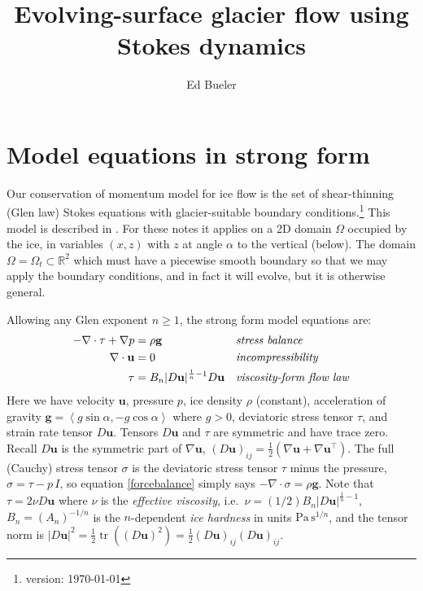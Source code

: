 \documentclass[letterpaper,final,12pt,reqno]{amsart}
\newcommand{\RR}{\mathbb{R}}
\newcommand{\grad}{\nabla}
\newcommand{\Div}{\nabla\cdot}
\newcommand{\trace}{\operatorname{tr}}
\newcommand{\bg}{\mathbf{g}}
\newcommand{\bu}{\mathbf{u}}
\begin{document}
\title{Evolving-surface glacier flow using Stokes dynamics}

\author{Ed Bueler}

\maketitle

\thispagestyle{empty}
\bigskip

\section{Model equations in strong form} \label{sec:strongform}

Our conservation of momentum model for ice flow is the set of shear-thinning (Glen law) Stokes equations with glacier-suitable boundary conditions.\footnote{version: \today}  This model is described in \cite{GreveBlatter2009,JouvetRappaz2011}.  For these notes it applies on a 2D domain $\Omega$ occupied by the ice, in variables $(x,z)$ with $z$ at angle $\alpha$ to the vertical (below).  The domain $\Omega = \Omega_t \subset \RR^2$ which must have a piecewise smooth boundary so that we may apply the boundary conditions, and in fact it will evolve, but it is otherwise general.

Allowing any Glen exponent $n\ge 1$, the strong form model equations are:
\begin{align}
- \nabla \cdot \tau + \nabla p &= \rho \bg &&\text{\emph{stress balance}} \label{forcebalance} \\
\nabla \cdot \bu &= 0 &&\text{\emph{incompressibility}} \label{incompressible} \\
\tau &= B_n |D\bu|^{\frac{1}{n} - 1} D\bu  &&\text{\emph{viscosity-form flow law}} \label{viscflowlaw}
\end{align}
Here we have velocity $\bu$, pressure $p$, ice density $\rho$ (constant), acceleration of gravity $\bg = \left<g\sin\alpha,-g\cos\alpha\right>$ where $g>0$, deviatoric stress tensor $\tau$, and strain rate tensor $D\bu$.  Tensors $D\bu$ and $\tau$ are symmetric and have trace zero.  Recall $D\bu$ is the symmetric part of $\grad \bu$, $(D\bu)_{ij} = \frac{1}{2} \left(\grad\bu + \grad\bu^\top\right)$.  The full (Cauchy) stress tensor $\sigma$ is the deviatoric stress tensor $\tau$ minus the pressure, $\sigma = \tau - p\,I$, so equation \eqref{forcebalance} simply says $-\Div \sigma = \rho \bg$.  Note that $\tau = 2\nu D\bu$ where $\nu$ is the \emph{effective viscosity}, i.e.~$\nu=(1/2)B_n |D\bu|^{\frac{1}{n} - 1}$, $B_n = (A_n)^{-1/n}$ is the $n$-dependent \emph{ice hardness} in units $\text{Pa}\,\text{s}^{1/n}$, and the tensor norm is $|D\bu|^2 = \frac{1}{2} \trace\left((D\bu)^2\right) = \frac{1}{2} (D\bu)_{ij} (D\bu)_{ij}$.
\end{document}
